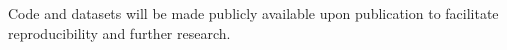 Code and datasets will be made publicly available upon publication to facilitate reproducibility and further research.






